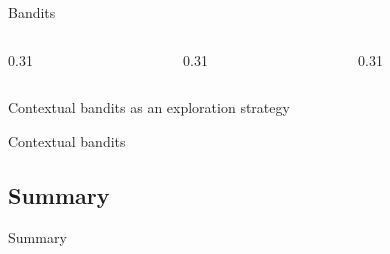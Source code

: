 \begin{frame}{Bandits}
  \begin{columns}[T,onlytextwidth]
    \begin{column}{0.31\textwidth}
      \begin{tdblock}[equal height group=band]
      \end{tdblock}
    \end{column}
    \begin{column}{0.31\textwidth}
      \begin{tdblock}[equal height group=band]
      \end{tdblock}
    \end{column}
    \begin{column}{0.31\textwidth}
      \begin{tdblock}[equal height group=band]
      \end{tdblock}
    \end{column}
  \end{columns}
\end{frame}

\begin{frame}{Contextual bandits as an exploration strategy}
  \begin{tddef}{Contextual bandits}
  \end{tddef}
\end{frame}

\subsection{Summary}

\begin{frame}{Summary}
  \begin{statement}
    \substatement{}
  \end{statement}
\end{frame}

\chapterreferences
